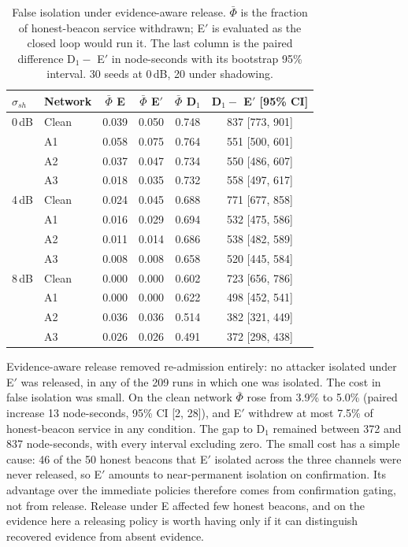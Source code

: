 \begin{table}[!t]
\caption{False isolation under evidence-aware release. $\bar\Phi$ is the
fraction of honest-beacon service withdrawn; E$'$ is evaluated as the closed
loop would run it. The last column is the paired difference D$_1 -$ E$'$ in
node-seconds with its bootstrap 95\% interval. 30 seeds at 0\,dB, 20 under
shadowing.}
\label{tab:release}
\centering
\footnotesize
\setlength{\tabcolsep}{4pt}
\begin{tabular}{@{}llcccc@{}}
\toprule
$\sigma_{sh}$ & Network & $\bar\Phi$ E & $\bar\Phi$ E$'$ & $\bar\Phi$ D$_1$ & D$_1 -$ E$'$ [95\% CI] \\
\midrule
0\,dB & Clean & 0.039 & 0.050 & 0.748 & 837 [773, 901] \\
      & A1    & 0.058 & 0.075 & 0.764 & 551 [500, 601] \\
      & A2    & 0.037 & 0.047 & 0.734 & 550 [486, 607] \\
      & A3    & 0.018 & 0.035 & 0.732 & 558 [497, 617] \\
4\,dB & Clean & 0.024 & 0.045 & 0.688 & 771 [677, 858] \\
      & A1    & 0.016 & 0.029 & 0.694 & 532 [475, 586] \\
      & A2    & 0.011 & 0.014 & 0.686 & 538 [482, 589] \\
      & A3    & 0.008 & 0.008 & 0.658 & 520 [445, 584] \\
8\,dB & Clean & 0.000 & 0.000 & 0.602 & 723 [656, 786] \\
      & A1    & 0.000 & 0.000 & 0.622 & 498 [452, 541] \\
      & A2    & 0.036 & 0.036 & 0.514 & 382 [321, 449] \\
      & A3    & 0.026 & 0.026 & 0.491 & 372 [298, 438] \\
\bottomrule
\end{tabular}
\end{table}

Evidence-aware release removed re-admission entirely: no attacker isolated
under E$'$ was released, in any of the 209 runs in which one was isolated. The
cost in false isolation was small. On the clean network $\bar\Phi$ rose from
3.9\% to 5.0\% (paired increase 13 node-seconds, 95\% CI [2, 28]), and E$'$
withdrew at most 7.5\% of honest-beacon service in any condition. The gap to
D$_1$ remained between 372 and 837 node-seconds, with every interval
excluding zero. The small cost has a simple cause: 46 of the 50 honest
beacons that E$'$ isolated across the three channels were never released, so
E$'$ amounts to near-permanent isolation on confirmation. Its advantage over
the immediate policies therefore comes from confirmation gating, not from
release. Release under E affected few honest beacons, and on the evidence
here a releasing policy is worth having only if it can distinguish recovered
evidence from absent evidence.

